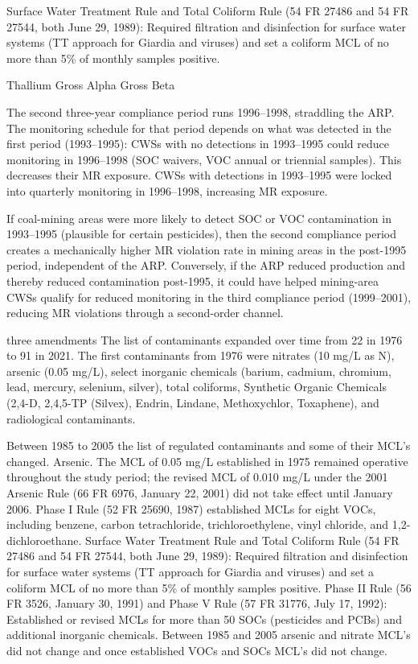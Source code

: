 Surface Water Treatment Rule and Total Coliform Rule (54 FR 27486 and 54 FR 27544, both June 29, 1989): Required filtration and disinfection for surface water systems (TT approach for Giardia and viruses) and set a coliform MCL of no more than 5\% of monthly samples positive.

Thallium
Gross Alpha
Gross Beta 

The second three-year compliance period runs 1996–1998, straddling the ARP. The monitoring schedule for that period depends on what was detected in the first period (1993–1995): CWSs with no detections in 1993–1995 could reduce monitoring in 1996–1998 (SOC waivers, VOC annual or triennial samples). This decreases their MR exposure. CWSs with detections in 1993–1995 were locked into quarterly monitoring in 1996–1998, increasing MR exposure.

If coal-mining areas were more likely to detect SOC or VOC contamination in 1993–1995 (plausible for certain pesticides), then the second compliance period creates a mechanically higher MR violation rate in mining areas in the post-1995 period, independent of the ARP. Conversely, if the ARP reduced production and thereby reduced contamination post-1995, it could have helped mining-area CWSs qualify for reduced monitoring in the third compliance period (1999–2001), reducing MR violations through a second-order channel.

three amendments The list of contaminants expanded over time from 22 in 1976 to 91 in 2021. The first contaminants from 1976 were nitrates (10 mg/L as N), arsenic (0.05 mg/L), select inorganic chemicals (barium, cadmium, chromium, lead, mercury, selenium, silver), total coliforms, Synthetic Organic Chemicals (2,4-D, 2,4,5-TP (Silvex), Endrin, Lindane, Methoxychlor, Toxaphene), and radiological contaminants.

Between 1985 to 2005 the list of regulated contaminants and some of their MCL's changed. Arsenic. The MCL of 0.05 mg/L established in 1975 remained operative throughout the study period; the revised MCL of 0.010 mg/L under the 2001 Arsenic Rule (66 FR 6976, January 22, 2001) did not take effect until January 2006. Phase I Rule (52 FR 25690, 1987) established MCLs for eight VOCs, including benzene, carbon tetrachloride, trichloroethylene, vinyl chloride, and 1,2-dichloroethane. Surface Water Treatment Rule and Total Coliform Rule (54 FR 27486 and 54 FR 27544, both June 29, 1989): Required filtration and disinfection for surface water systems (TT approach for Giardia and viruses) and set a coliform MCL of no more than 5\% of monthly samples positive. Phase II Rule (56 FR 3526, January 30, 1991) and Phase V Rule (57 FR 31776, July 17, 1992): Established or revised MCLs for more than 50 SOCs (pesticides and PCBs) and additional inorganic chemicals. Between 1985 and 2005 arsenic and nitrate MCL's did not change and once established VOCs and SOCs MCL's did not change.

